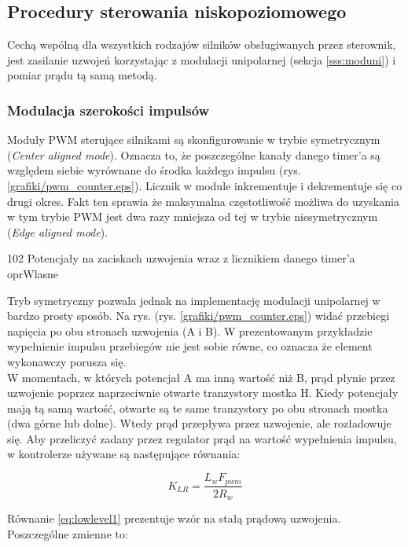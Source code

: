 \subsection{Procedury sterowania niskopoziomowego}
\label{sss:lowlevel}

Cechą wspólną dla wszystkich rodzajów silników obsługiwanych przez sterownik, jest zasilanie uzwojeń korzystając z  modulacji unipolarnej (sekcja \ref{sss:moduni}) i pomiar prądu tą samą metodą. 

\subsubsection{Modulacja szerokości impulsów}
\label{sss:pwm_soft}

Moduły PWM sterujące silnikami są skonfigurowanie w trybie symetrycznym ({\it Center aligned mode}). Oznacza to, że poszczególne kanały danego timer'a są względem siebie wyrównane do środka każdego impulsu (rys. \ref{grafiki/pwm_counter.eps}). Licznik w module inkrementuje i dekrementuje się co drugi okres. Fakt ten sprawia że maksymalna częstotliwość możliwa do uzyskania w tym trybie PWM jest dwa razy mniejsza od tej w trybie niesymetrycznym ({\it Edge aligned mode}).

	{102}
	{Potencjały na zaciskach uzwojenia wraz z licznikiem danego timer'a}
	{oprWlasne}
	
Tryb symetryczny pozwala jednak na implementację modulacji unipolarnej w bardzo prosty sposób. Na rys. (rys. \ref{grafiki/pwm_counter.eps}) widać przebiegi napięcia po obu stronach uzwojenia (A i B). W prezentowanym przykładzie wypełnienie impulsu przebiegów nie jest sobie równe, co oznacza że element wykonawczy porusza się. \\

W momentach, w których potencjał A ma inną wartość niż B, prąd płynie przez uzwojenie poprzez naprzeciwnie otwarte tranzystory mostka H. Kiedy potencjały mają tą samą wartość, otwarte są te same tranzystory po obu stronach mostka (dwa górne lub dolne). Wtedy prąd przepływa przez uzwojenie, ale rozładowuje się. Aby przeliczyć zadany przez regulator prąd na wartość wypełnienia impulsu, w kontrolerze używane są następujące równania: 

\begin{equation} \label{eq:lowlevel1}
	K_{LR} = \frac{L_w F_{pwm}}{2 R_w}
\end{equation}

Równanie \ref{eq:lowlevel1} prezentuje wzór na stałą prądową uzwojenia. Poszczególne zmienne to:

